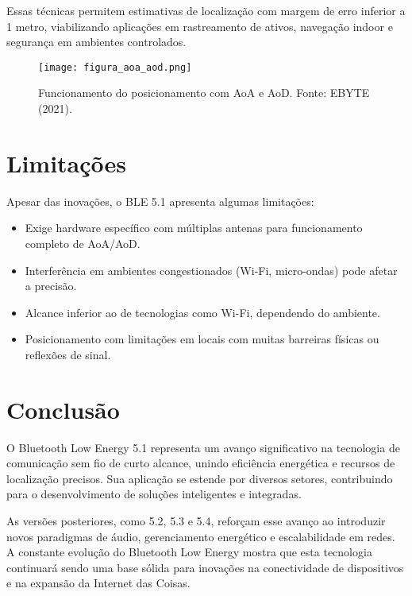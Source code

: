 \documentclass[12pt,a4paper]{report}
\begin{document}
Essas técnicas permitem estimativas de localização com margem de erro inferior a 1 metro, viabilizando aplicações em rastreamento de ativos, navegação indoor e segurança em ambientes controlados.

\begin{figure}[h!]
    \centering
    \texttt{[image: figura\_aoa\_aod.png]}
    \caption{Funcionamento do posicionamento com AoA e AoD. Fonte: EBYTE (2021).}
    \label{fig:aoa_aod}
\end{figure}

\chapter{Limitações}
Apesar das inovações, o BLE 5.1 apresenta algumas limitações:
\begin{itemize}
    \item Exige hardware específico com múltiplas antenas para funcionamento completo de AoA/AoD.
    \item Interferência em ambientes congestionados (Wi-Fi, micro-ondas) pode afetar a precisão.
    \item Alcance inferior ao de tecnologias como Wi-Fi, dependendo do ambiente.
    \item Posicionamento com limitações em locais com muitas barreiras físicas ou reflexões de sinal.
\end{itemize}

\chapter{Conclusão}
O Bluetooth Low Energy 5.1 representa um avanço significativo na tecnologia de comunicação sem fio de curto alcance, unindo eficiência energética e recursos de localização precisos. Sua aplicação se estende por diversos setores, contribuindo para o desenvolvimento de soluções inteligentes e integradas.

As versões posteriores, como 5.2, 5.3 e 5.4, reforçam esse avanço ao introduzir novos paradigmas de áudio, gerenciamento energético e escalabilidade em redes. A constante evolução do Bluetooth Low Energy mostra que esta tecnologia continuará sendo uma base sólida para inovações na conectividade de dispositivos e na expansão da Internet das Coisas.
\end{document}

